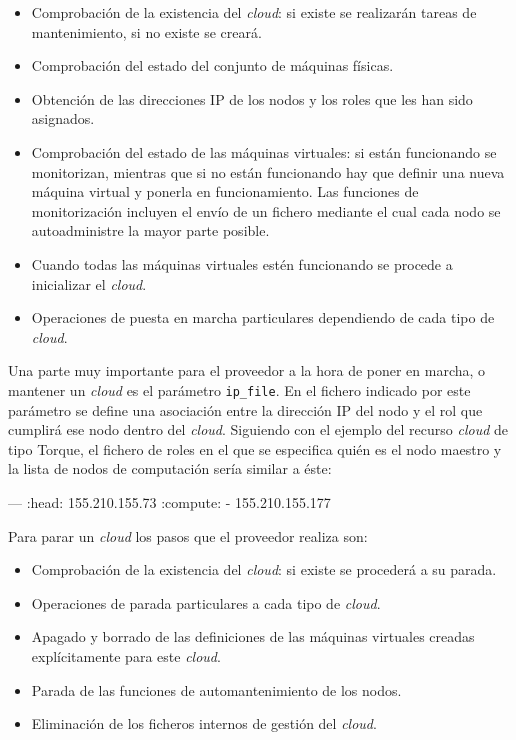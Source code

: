 \begin{itemize}
\item Comprobación de la existencia del \emph{cloud}: si existe se realizarán tareas de mantenimiento, si no existe se creará.
\item Comprobación del estado del conjunto de máquinas físicas.
\item Obtención de las direcciones IP de los nodos y los roles que les han sido asignados.
\item Comprobación del estado de las máquinas virtuales: si están funcionando se monitorizan, mientras que si no están funcionando hay que definir una nueva máquina virtual y ponerla en funcionamiento. Las funciones de monitorización incluyen el envío de un fichero mediante el cual cada nodo se autoadministre la mayor parte posible.
\item Cuando todas las máquinas virtuales estén funcionando se procede a inicializar el \emph{cloud}.
\item Operaciones de puesta en marcha particulares dependiendo de cada tipo de \emph{cloud}.
\end{itemize}

Una parte muy importante para el proveedor a la hora de poner en marcha, o mantener un \emph{cloud} es el parámetro \texttt{ip\_file}. En el fichero indicado por este parámetro se define una asociación entre la dirección IP del nodo y el rol que cumplirá ese nodo dentro del \emph{cloud}. Siguiendo con el ejemplo del recurso \emph{cloud} de tipo Torque, el fichero de roles en el que se especifica quién es el nodo maestro y la lista de nodos de computación sería similar a éste:

\begin{yamlcode}
--- 
:head: 155.210.155.73
:compute:
- 155.210.155.177
\end{yamlcode}

Para parar un \emph{cloud} los pasos que el proveedor realiza son:

\begin{itemize}
\item Comprobación de la existencia del \emph{cloud}: si existe se procederá a su parada.
\item Operaciones de parada particulares a cada tipo de \emph{cloud}.
\item Apagado y borrado de las definiciones de las máquinas virtuales creadas explícitamente para este \emph{cloud}.
\item Parada de las funciones de automantenimiento de los nodos.
\item Eliminación de los ficheros internos de gestión del \emph{cloud}.
\end{itemize}

